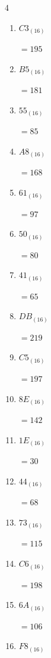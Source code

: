 \begin{multicols}{4}
\begin{enumerate}
        $=90$

  \item $C3_{(16)}$

        $=195$

  \item $B5_{(16)}$

        $=181$

  \item $55_{(16)}$

        $=85$

  \item $A8_{(16)}$

        $=168$

  \item $61_{(16)}$

        $=97$

  \item $50_{(16)}$

        $=80$

\columnbreak %

\resetques

  \item $41_{(16)}$

        $=65$

  \item $DB_{(16)}$

        $=219$

  \item $C5_{(16)}$

        $=197$

  \item $8E_{(16)}$

        $=142$

  \item $1E_{(16)}$

        $=30$

  \item $44_{(16)}$

        $=68$

  \item $73_{(16)}$

        $=115$

  \item $C6_{(16)}$

        $=198$

  \item $6A_{(16)}$

        $=106$

  \item $F8_{(16)}$


\end{enumerate}
\end{multicols}
